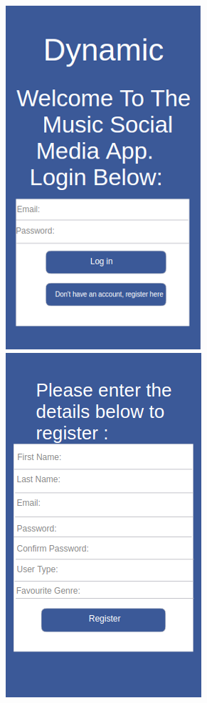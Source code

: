\begin{center}
\begin{figure}[H]
\includegraphics[scale=0.5]{images/ui1}
\includegraphics[scale=0.5]{images/ui2}

\end{figure}
\end{center}
